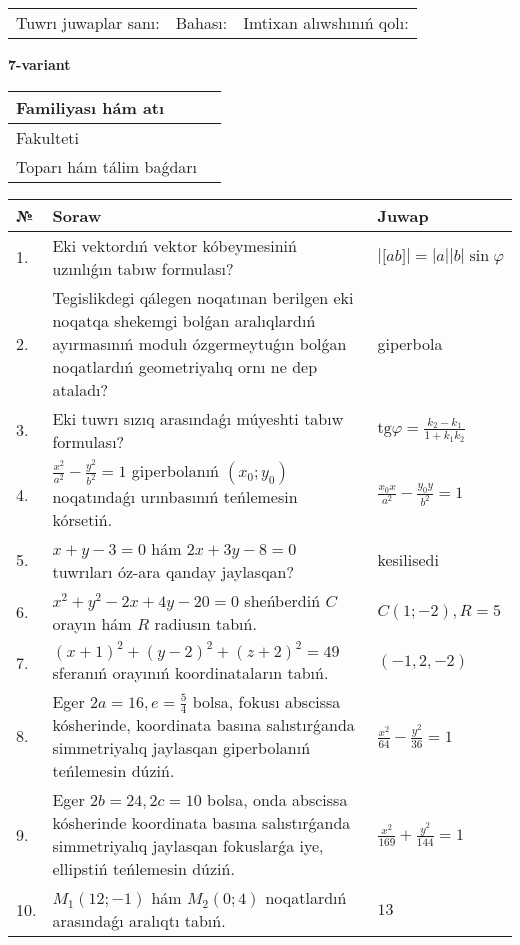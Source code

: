 \documentclass{article}
\begin{document}
\begin{tabular}{lll}
Tuwrı juwaplar sanı: \underline{\hspace{1.5cm}} & 
Bahası: \underline{\hspace{1.5cm}} & 
Imtixan alıwshınıń qolı: \underline{\hspace{2cm}} \\
\end{tabular}

\egroup

\newpage


\textbf{7-variant}\\

\bgroup
\def\arraystretch{1.6} %

\begin{tabular}{|m{5.7cm}|m{9.5cm}|}
\hline
Familiyası hám atı & \\
\hline
Fakulteti  & \\
\hline
Toparı hám tálim baǵdarı  & \\
\hline
\end{tabular}

\vspace{1cm}

\begin{tabular}{|m{0.7cm}|m{10cm}|m{4cm}|}
\hline
№ & Soraw & Juwap \\
\hline
1. & Eki vektordıń vektor kóbeymesiniń uzınlıǵın tabıw formulası? & $\left| \lbrack ab\rbrack \right|=|a||b|\sin\varphi$ \\
\hline
2. & Tegislikdegi qálegen noqatınan berilgen eki noqatqa shekemgi bolǵan aralıqlardıń ayırmasınıń modulı ózgermeytuǵın bolǵan noqatlardıń geometriyalıq ornı ne dep ataladı? & giperbola \\
\hline
3. & Eki tuwrı sızıq arasındaǵı múyeshti tabıw formulası? & $\text{tg}\varphi=\frac{k_2-k_1}{1+k_1k_2}$ \\
\hline
4. & $\frac{x^2}{a^2}-\frac{y^2}{b^2}=1$ giperbolanıń $(x_0;y_0)$ noqatındaǵı urınbasınıń teńlemesin kórsetiń. & $\frac{x_0x}{a^2}-\frac{y_0y}{b^2}=1$ \\
\hline
5. & $x+y-3=0$ hám $2x+3y-8=0$ tuwrıları óz-ara qanday jaylasqan? & kesilisedi \\
\hline
6. & $x^{2}+y^{2}-2x+4y-20=0$ sheńberdiń $C$ orayın hám $R$ radiusın tabıń. & $C(1;-2), R=5$ \\
\hline
7. & $(x+1)^{2}+(y-2) ^{2}+(z+2) ^{2}=49$ sferanıń orayınıń koordinataların tabıń. & $(-1,2,-2)$ \\
\hline
8. & Eger $2a=16, e=\frac{5}{4}$ bolsa, fokusı abscissa kósherinde, koordinata basına salıstırǵanda simmetriyalıq jaylasqan giperbolanıń teńlemesin dúziń. & $\frac{x^{2}}{64}-\frac{y^{2}}{36}=1$ \\
\hline
9. & Eger $2b=24, 2 c=10$ bolsa, onda abscissa kósherinde koordinata basına salıstırǵanda simmetriyalıq jaylasqan fokuslarǵa iye, ellipstiń teńlemesin dúziń. & $\frac{x^{2}}{169}+\frac{y^{2}}{144}=1$ \\
\hline
10. & $M_{1} (12;-1)$ hám $M_{2} (0;4)$ noqatlardıń arasındaǵı aralıqtı tabıń. & $13$ \\
\hline
\end{tabular}
\end{document}
